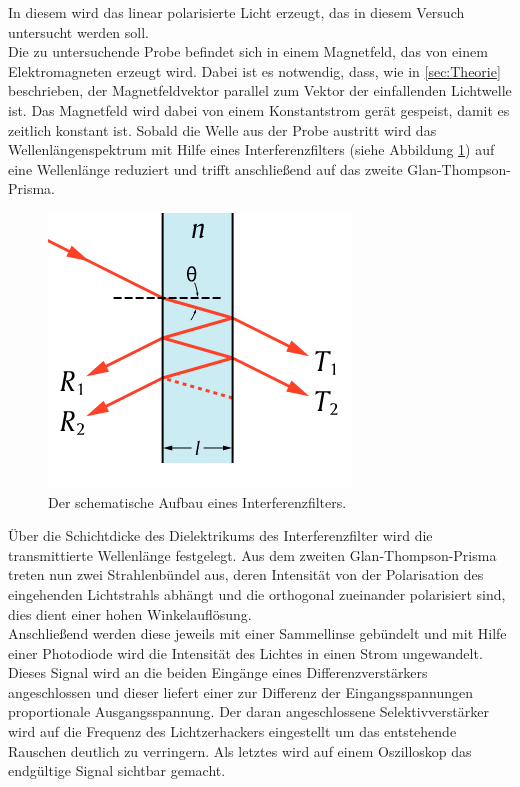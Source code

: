 In diesem wird das linear polarisierte Licht erzeugt, das in diesem Versuch untersucht werden soll.\\ Die zu untersuchende Probe befindet sich in einem Magnetfeld, das von einem Elektromagneten erzeugt wird.
Dabei ist es notwendig, dass, wie in
\ref{sec:Theorie} beschrieben, der Magnetfeldvektor parallel zum Vektor der einfallenden Lichtwelle ist. Das Magnetfeld wird dabei von einem Konstantstrom gerät gespeist, damit es zeitlich konstant ist. Sobald die Welle aus der Probe austritt wird das Wellenlängenspektrum mit Hilfe eines Interferenzfilters (siehe Abbildung \ref{fig:inter}) auf eine Wellenlänge reduziert und trifft anschließend auf das zweite Glan-Thompson-Prisma.
\begin{figure}[h!]
  \centering
  \includegraphics[scale=0.5]{fig/inter.png}
  \caption{Der schematische Aufbau eines Interferenzfilters. \cite{Anleitung4}}
  \label{fig:inter}
\end{figure}
Über die Schichtdicke des Dielektrikums des Interferenzfilter wird die transmittierte Wellenlänge festgelegt. Aus dem zweiten Glan-Thompson-Prisma treten nun zwei Strahlenbündel aus, deren
Intensität von der Polarisation des eingehenden Lichtstrahls abhängt und die orthogonal zueinander polarisiert sind, dies dient einer hohen Winkelauflösung.\\
Anschließend werden diese jeweils mit einer Sammellinse gebündelt und mit Hilfe einer Photodiode wird die Intensität des Lichtes in einen Strom ungewandelt. Dieses Signal wird an die beiden Eingänge eines
Differenzverstärkers angeschlossen und dieser liefert einer zur Differenz der Eingangsspannungen proportionale Ausgangsspannung. Der daran angeschlossene Selektivverstärker wird auf die Frequenz des Lichtzerhackers eingestellt um
das entstehende Rauschen deutlich zu verringern. Als letztes wird auf einem Oszilloskop das endgültige Signal sichtbar gemacht.
